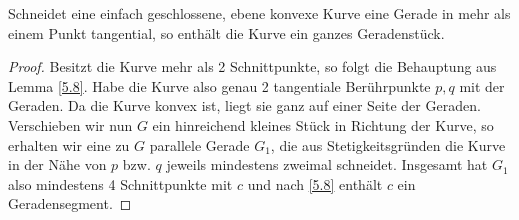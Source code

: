 \documentclass{mycourse}
\begin{document}
\begin{lem}
\label{5.9}
Schneidet eine einfach geschlossene, ebene konvexe Kurve eine Gerade in mehr als einem Punkt tangential, so enthält die Kurve ein ganzes Geradenstück.

\begin{proof}
Besitzt die Kurve mehr als 2 Schnittpunkte, so folgt die Behauptung aus Lemma \ref{5.8}. Habe die Kurve also genau 2 tangentiale Berührpunkte $p, q$ mit der Geraden. Da die Kurve konvex ist, liegt sie ganz auf einer Seite der Geraden. Verschieben wir nun $G$ ein hinreichend kleines Stück in Richtung der Kurve, so erhalten wir eine zu $G$ parallele Gerade $G_1$, die aus Stetigkeitsgründen die Kurve in der Nähe von $p$ bzw. $q$ jeweils mindestens zweimal schneidet. Insgesamt hat $G_1$ also mindestens 4 Schnittpunkte mit $c$ und nach \ref{5.8} enthält $c$ ein Geradensegment. 
\end{proof}
\end{lem}
\end{document}
